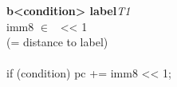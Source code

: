 


\begin{instructionblock}{\imagewidth}%
    \textbf{b<condition> label}\hfill\textit{T1}\\
    imm8 $\in$ \immEight\ {<}{<} 1\\
    (= distance to label)\\
    {}\\
    if (condition) pc += imm8 {<}{<} 1;
\end{instructionblock}

